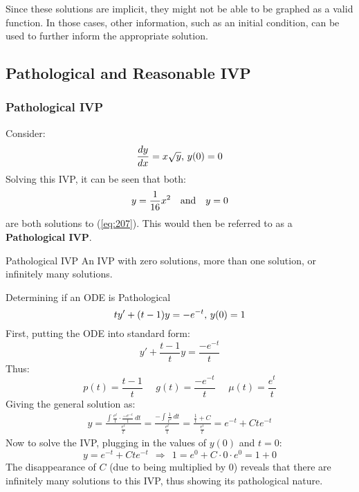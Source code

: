\documentclass[12pt]{article}
\begin{document}
Since these solutions are implicit, they might not be able to be graphed as a valid function. In those cases, other information, such as an initial condition, can be used to further inform the appropriate solution.

\subsection{Pathological and Reasonable IVP}
\label{ssec:pathologicalAndReasonableIVP}

\subsubsection{Pathological IVP}
\label{sssec:pathologicalIVP}

Consider:
\begin{equation}
  \frac{dy}{dx}=x \sqrt{y}\textup{, }y(0) = 0
  \label{eq:207}
\end{equation}
Solving this IVP, it can be seen that both:
\begin{equation*}
  y = \frac{1}{16}x^2\ \ \ \textup{and}\ \ \ y=0
\end{equation*}
are both solutions to (\ref{eq:207}). This would then be referred to as a \textbf{Pathological IVP}.

\begin{definition}{Pathological IVP}
  An IVP with zero solutions, more than one solution, or infinitely many solutions.
\end{definition}

\begin{example}{Determining if an ODE is Pathological}
  \begin{equation*}
    ty'+(t-1)y = -e^{-t}\textup{,}\ y(0) = 1
  \end{equation*}
  First, putting the ODE into standard form:
  \begin{equation*}
    y'+ \frac{t-1}{t}y = \frac{-e^{-t}}{t}
  \end{equation*}
  Thus:
  \begin{equation*}
    p(t) = \frac{t-1}{t}\ \ \ \ \ \ g(t) = \frac{-e^{-t}}{t}\ \ \ \ \ \ \mu(t) = \frac{e^t}{t}
  \end{equation*}
  Giving the general solution as:
  \begin{align*}
    y = \frac{\int \frac{e^t}{t} \cdot \frac{-e^{-t}}{t} \,dt}{\frac{e^t}{t}} = \frac{-\int \frac{1}{t^2} \,dt}{\frac{e^t}{t}} = \frac{\frac{1}{t} + C}{\frac{e^t}{t}} = e^{-t} + Cte^{-t}
  \end{align*}
  Now to solve the IVP, plugging in the values of $y(0)$ and $t=0$:
  \begin{equation*}
    y = e^{-t} + Cte^{-t}\ \  \Rightarrow\ \ 1 = e^{0} + C \cdot 0 \cdot e^{0} = 1 + 0
  \end{equation*}
  The disappearance of $C$ (due to being multiplied by $0$) reveals that there are infinitely many solutions to this IVP, thus showing its pathological nature.
\end{example}
\end{document}

